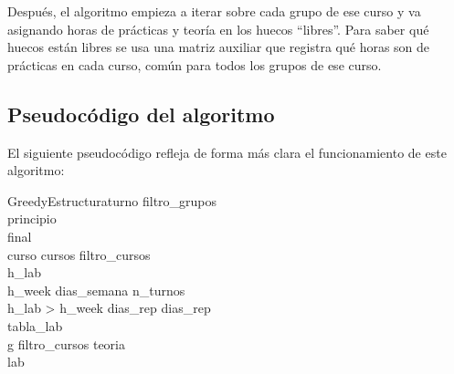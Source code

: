 Después, el algoritmo empieza a iterar sobre cada grupo de ese curso y va asignando horas de prácticas y teoría en los huecos ``libres''. Para saber qué huecos están libres se usa una matriz auxiliar que registra qué horas son de prácticas en cada curso, común para todos los grupos de ese curso.

\subsection{Pseudocódigo del algoritmo}
El siguiente pseudocódigo refleja de forma más clara el funcionamiento de este algoritmo:

\begin{pseudocode}{GreedyEstructura}{turno}
\label{greedyestructura}
filtro\_grupos \GETS {}\\
principio \GETS {}\\
final \GETS {}\\
\FOREACH curso \in cursos \DO
\BEGIN
    filtro\_cursos \GETS {}\\
    h\_lab \GETS {}\\
    h\_week \GETS dias\_semana \cdot n\_turnos\\

    \IF h\_lab > h\_week \THEN
	    	dias\_rep \GETS {}
    \ELSE 
      dias\_rep \GETS \emptyset\\

   	tabla\_lab \GETS {}\\

   	\FOREACH g \in filtro\_cursos \DO
   	\BEGIN
   		teoria \GETS {}\\
   		lab \GETS {}\\


\end{pseudocode}
